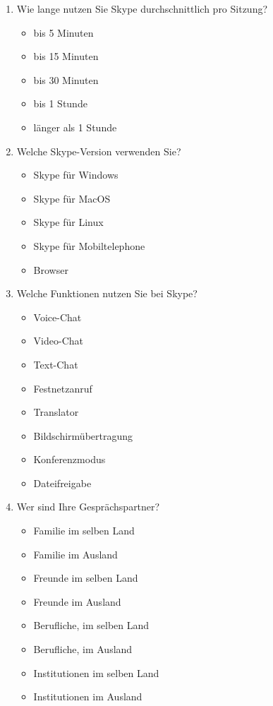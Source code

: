 \begin{enumerate}[resume]
\item Wie lange nutzen Sie Skype durchschnittlich pro Sitzung?

		\begin{itemize}
		\item[\Circle] bis 5 Minuten
        \item[\Circle] bis 15 Minuten
        \item[\Circle] bis 30 Minuten
        \item[\Circle] bis 1 Stunde
        \item[\Circle] länger als 1 Stunde
		\end{itemize}
        
\item Welche Skype-Version verwenden Sie?

		\begin{itemize}
		\item[\Circle] Skype für Windows
        \item[\Circle] Skype für MacOS
        \item[\Circle] Skype für Linux
        \item[\Circle] Skype für Mobiltelephone
        \item[\Circle] Browser
		\end{itemize}
        
\item Welche Funktionen nutzen Sie bei Skype?

		\begin{itemize}
		\item[\Circle] Voice-Chat
        \item[\Circle] Video-Chat
        \item[\Circle] Text-Chat
        \item[\Circle] Festnetzanruf
        \item[\Circle] Translator
        \item[\Circle] Bildschirmübertragung
        \item[\Circle] Konferenzmodus
        \item[\Circle] Dateifreigabe
		\end{itemize}
        
\item Wer sind Ihre Gesprächspartner?

		\begin{itemize}
		\item[\Circle] Familie im selben Land
        \item[\Circle] Familie im Ausland
        \item[\Circle] Freunde im selben Land
        \item[\Circle] Freunde im Ausland
        \item[\Circle] Berufliche, im selben Land
        \item[\Circle] Berufliche, im Ausland
        \item[\Circle] Institutionen im selben Land
        \item[\Circle] Institutionen im Ausland
		\end{itemize}
		

\end{enumerate}
